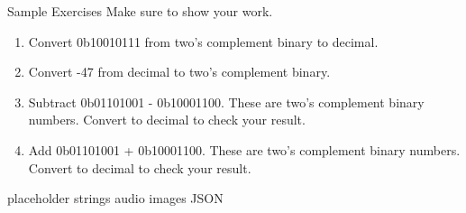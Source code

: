 \begin{frame}{Sample Exercises}
Make sure to show your work.
\begin{enumerate}
    \item Convert 0b10010111 from two's complement binary to decimal.
    \item Convert -47 from decimal to two's complement binary. 
    \item Subtract 0b01101001 - 0b10001100. These are two's complement binary numbers. Convert to decimal to check your result.
    \item Add 0b01101001 + 0b10001100. These are two's complement binary numbers. Convert to decimal to check your result.
\end{enumerate}
\end{frame}




\begin{frame}{placeholder}
    strings
    audio
    images
    JSON
\end{frame}
    
